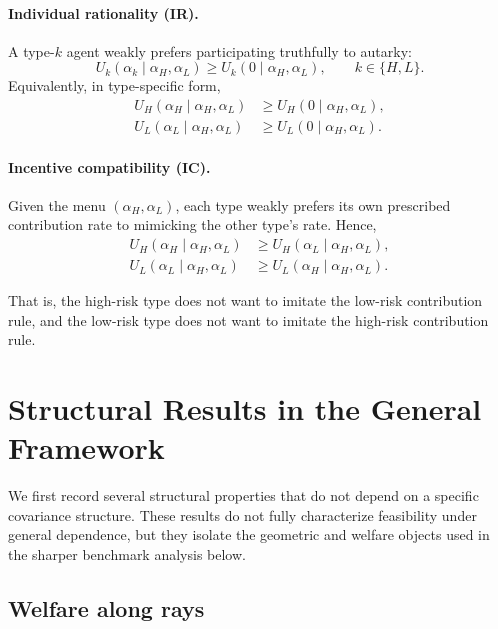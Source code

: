 \documentclass[a4paper,12pt]{article}
\theoremstyle{definition}
\theoremstyle{remark}
\newcommand{\1}{\mathbf{1}}
\begin{document}
\paragraph{Individual rationality (IR).}
A type-\(k\) agent weakly prefers participating truthfully to autarky:
\begin{equation}\label{eq:IR-k}
U_k(\alpha_k \mid \alpha_H,\alpha_L)\ge U_k(0 \mid \alpha_H,\alpha_L),
\qquad k\in\{H,L\}.
\end{equation}
Equivalently, in type-specific form,
\begin{align}
U_H(\alpha_H \mid \alpha_H,\alpha_L) &\ge U_H(0 \mid \alpha_H,\alpha_L), \label{eq:IR-H}\\
U_L(\alpha_L \mid \alpha_H,\alpha_L) &\ge U_L(0 \mid \alpha_H,\alpha_L). \label{eq:IR-L}
\end{align}

\paragraph{Incentive compatibility (IC).}
Given the menu \((\alpha_H,\alpha_L)\), each type weakly prefers its own prescribed contribution rate to mimicking the other type's rate. Hence,
\begin{subequations}\label{eq:IC}
\begin{align}
U_H(\alpha_H \mid \alpha_H,\alpha_L) 
&\ge U_H(\alpha_L \mid \alpha_H,\alpha_L), \label{eq:IC-H}\\
U_L(\alpha_L \mid \alpha_H,\alpha_L) 
&\ge U_L(\alpha_H \mid \alpha_H,\alpha_L). \label{eq:IC-L}
\end{align}
\end{subequations}

That is, the high-risk type does not want to imitate the low-risk contribution rule, and the low-risk type does not want to imitate the high-risk contribution rule.

\section{Structural Results in the General Framework}\label{sec:general-results}

We first record several structural properties that do not depend on a specific covariance structure. These results do not fully characterize feasibility under general dependence, but they isolate the geometric and welfare objects used in the sharper benchmark analysis below.

\subsection{Welfare along rays}
\end{document}
